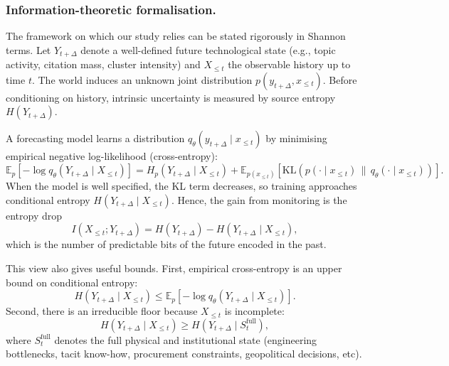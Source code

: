 \documentclass[pdflatex,sn-basic]{sn-jnl}
\begin{document}
\subsubsection{Information-theoretic formalisation.}
The framework on which our study relies can be stated rigorously in Shannon terms.
Let $Y_{t+\Delta}$ denote a well-defined future technological state (e.g., topic activity, citation mass, cluster intensity) and $X_{\leq t}$ the observable history up to time $t$.
The world induces an unknown joint distribution $p(y_{t+\Delta}, x_{\leq t})$.
Before conditioning on history, intrinsic uncertainty is measured by source entropy $H(Y_{t+\Delta})$.

A forecasting model learns a distribution $q_{\theta}(y_{t+\Delta}\mid x_{\leq t})$ by minimising empirical negative log-likelihood (cross-entropy):
\[
\mathbb{E}_{p}\!\left[-\log q_{\theta}(Y_{t+\Delta}\mid X_{\leq t})\right]
= H_{p}(Y_{t+\Delta}\mid X_{\leq t})
+ \mathbb{E}_{p(x_{\leq t})}\!\left[
\mathrm{KL}\!\left(p(\cdot\mid x_{\leq t}) \,\|\, q_{\theta}(\cdot\mid x_{\leq t})\right)\right].
\]
When the model is well specified, the KL term decreases, so training approaches conditional entropy $H(Y_{t+\Delta}\mid X_{\leq t})$. Hence, the gain from monitoring is the entropy drop
\[
I(X_{\leq t};Y_{t+\Delta})
= H(Y_{t+\Delta}) - H(Y_{t+\Delta}\mid X_{\leq t}),
\]
which is the number of predictable bits of the future encoded in the past.

This view also gives useful bounds. First, empirical cross-entropy is an upper bound on conditional entropy:
\[
H(Y_{t+\Delta}\mid X_{\leq t})
\leq
\mathbb{E}_{p}\!\left[-\log q_{\theta}(Y_{t+\Delta}\mid X_{\leq t})\right].
\]
Second, there is an irreducible floor because $X_{\leq t}$ is incomplete:
\[
H(Y_{t+\Delta}\mid X_{\leq t})
\geq
H(Y_{t+\Delta}\mid S^{\mathrm{full}}_{t}),
\]
where $S^{\mathrm{full}}_{t}$ denotes the full physical and institutional state (engineering bottlenecks, tacit know-how, procurement constraints, geopolitical decisions, etc).
\newline
\end{document}
